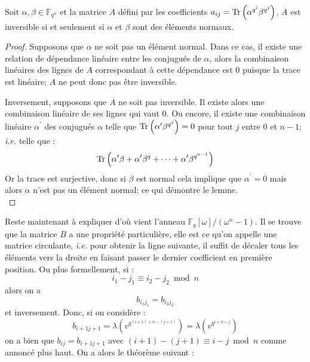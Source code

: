 \documentclass[a4paper]{article} %
\numberwithin{section}{part}
\numberwithin{equation}{section}
\newcommand\GF[1]{\mathbb{F}_{#1}}
\newcommand\Tr[1]{\textup{Tr}\left(#1\right)}
\begin{document}
\begin{lem}
\label{lem:mattrinv}
Soit $\alpha,\beta\in\GF{q^n}$ et la matrice $A$ défini par les coefficients 
$a_{ij} = \Tr{\alpha^{q^i}\beta^{q^j}}$, $A$ est inversible si et seulement si 
$\alpha$ et $\beta$ sont des éléments normaux.
\end{lem}
\begin{proof}
Supposons que $\alpha$ ne soit pas un élément normal. Dans ce cas, il existe une
relation de dépendance linéaire entre les conjugués de $\alpha$, alors la 
combinaison linéaires des lignes de $A$ correspondant à cette dépendance est $0$
puisque la trace est linéaire; $A$ ne peut donc pas être inversible.\par
Inversement, supposons que $A$ ne soit pas inversible. Il existe alors une 
combinaison linéaire de ses lignes qui vaut $0$. Ou encore, il existe une 
combinaison linéaire $\alpha^{\prime}$ des conjugués $\alpha$ telle que 
$\Tr{\alpha^{\prime}\beta^{q^j}} = 0$ pour tout $j$ entre $0$ et $n-1$; 
\textit{i.e.} telle que :
\[\Tr{\alpha^{\prime}\beta + \alpha^{\prime}\beta^q + \dots + 
\alpha^{\prime}\beta^{q^{n-1}}}\]
Or la trace est surjective,
donc si $\beta$ est normal cela implique que $\alpha^{\prime} = 0$ mais alors 
$\alpha$ n'est pas un élément normal; ce qui démontre le lemme.\\
\end{proof}
Reste maintenant à expliquer d'où vient l'anneau 
$\mathbb{F}_q[\omega]/(\omega^n - 1)$. Il se trouve que la matrice $B$ a une 
propriété particulière, elle est ce qu'on appelle une matrice circulante, 
\textit{i.e.} pour obtenir la ligne suivante, il suffit de décaler tous les 
éléments vers la droite en faisant passer le dernier coefficient en première 
position. Ou plus formellement, si :
\[i_1 - j_1 \equiv i_2 - j_2 \bmod n\]
alors on a 
\[b_{i_1j_1} = b_{i_2j_2}\]
et inversement. Donc, si on considère :
\[b_{i+1j+1} = \lambda\left(v^{q^{(i+1) + n - (j+1)}}\right) = 
\lambda\left(v^{q^{i+n-j}}\right)\]
on a bien que $b_{ij} = b_{i+1j+1}$ avec $(i+1) - (j+1) \equiv i - j \bmod n$ 
comme annoncé plus haut. On a alors le théorème suivant :
\end{document}
